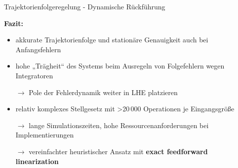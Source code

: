 \documentclass[
	ngerman,
	10pt,				%
	aspectratio=169 	%
]{beamer}
\begin{document}
\begin{frame}[t,fragile,label=trajektorienregelung_8]{\large Trajektorienfolgeregelung - Dynamische Rückführung}
	
	\textbf{Fazit:}
	\begin{itemize}
		\item akkurate Trajektorienfolge und stationäre Genauigkeit auch bei Anfangsfehlern
		\bigskip
		\pause
		\item hohe „Trägheit“ des Systems beim Ausregeln von Folgefehlern wegen Integratoren
		\item[$\rightarrow$] Pole der Fehlerdynamik weiter in LHE platzieren
		\bigskip
		\pause
		\item relativ komplexes Stellgesetz mit >20\,000 Operationen je Eingangsgröße
		\item[$\rightarrow$] lange Simulationszeiten, hohe Ressourcenanforderungen bei Implementierungen
		\pause
		\item[$\rightarrow$] vereinfachter heuristischer Ansatz mit \textbf{exact feedforward linearization}
	\end{itemize}
	
\end{frame}
 
\end{document}
